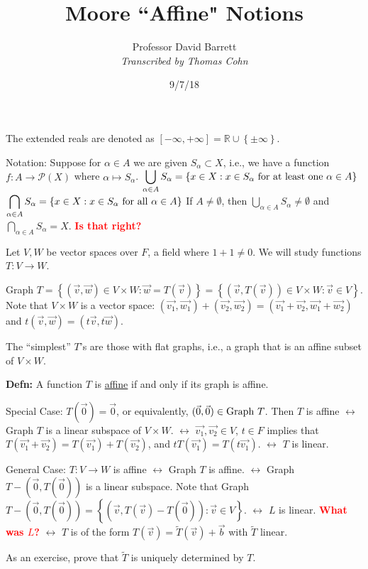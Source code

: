 \documentclass[10pt,letterpaper]{article}
\author{Professor David Barrett\\ \small\textit{Transcribed by Thomas Cohn}}
\title{Moore ``Affine" Notions}
\date{9/7/18} %
\newcommand{\n}{\hfill\break}
\newcommand{\defn}[1]{\par\noindent\settowidth{\hangindent}{\textbf{Defn: }}\textbf{Defn: }#1\n}
\newcommand{\ptxt}[1]{\textrm{\textnormal{#1}}}
\newcommand{\set}[1]{\left\{#1\right\}}
\newcommand{\ps}[1]{\mathcal{P}(#1)}
\newcommand{\reals}{\mathbb{R}}
\newcommand{\R}{\reals}
\newcommand{\flag}[1]{\textbf{\textcolor{red}{#1}}}
\begin{document}
\maketitle
\setlength\RaggedRightParindent{\parindent}
\RaggedRight

\par\noindent The extended reals are denoted as $[-\infty,+\infty]=\R\cup\set{\pm\infty}$.\n

\par\noindent Notation: Suppose for $\alpha\in{}A$ we are given $S_{\alpha}\subset{}X$, i.e., we have a function $f:A\to\ps{X}$ where $\alpha\mapsto{}S_{\alpha}$.\n
$\displaystyle\bigcup_{\alpha\in{}A}S_{\alpha}=\set{x\in{}X:x\in{}S_{\alpha}\ptxt{ for at least one }\alpha\in{}A}$\n
$\displaystyle\bigcap_{\alpha\in{}A}S_{\alpha}=\set{x\in{}X:x\in{}S_{\alpha}\ptxt{ for all }\alpha\in{}A}$\n
If $A\ne\emptyset$, then $\displaystyle\bigcup_{\alpha\in{}A}S_{\alpha}\ne\emptyset$ and $\displaystyle\bigcap_{\alpha\in{}A}S_{\alpha}=X$. \flag{Is that right?}\n\n

\par\noindent Let $V,W$ be vector spaces over $F$, a field where $1+1\ne{}0$. We will study functions $T:V\to{}W$.\n

\par\noindent Graph $T=\set{(\vec{v},\vec{w})\in{}V\times{}W:\vec{w}=T(\vec{v})}=\set{(\vec{v},T(\vec{v}))\in{}V\times{}W:\vec{v}\in{}V}$. Note that $V\times{}W$ is a vector space: $(\vec{v_{1}},\vec{w_{1}})+(\vec{v_{2}},\vec{w_{2}})=(\vec{v_{1}}+\vec{v_{2}},\vec{w_{1}}+\vec{w_{2}})$ and $t(\vec{v},\vec{w})=(t\vec{v},t\vec{w})$.\n

\par\noindent The ``simplest'' $T$'s are those with flat graphs, i.e., a graph that is an affine subset of $V\times{}W$.\n

\defn{A function $T$ is \underline{affine} if and only if its graph is affine.}

\par\noindent Special Case: $T(\vec{0})=\vec{0}$, or equivalently, $(\vec{0},\vec{0})\in\ptxt{Graph }T$.\n
Then $T$ is affine $\leftrightarrow$ Graph $T$ is a linear subspace of $V\times{}W$.\n
\phantom{Then $T$ is affine }$\leftrightarrow$ $\vec{v_{1}},\vec{v_{2}}\in{}V$, $t\in{}F$ implies that $T(\vec{v_{1}}+\vec{v_{2}})=T(\vec{v_{1}})+T(\vec{v_{2}})$, and $tT(\vec{v_{1}})=T(t\vec{v_{1}})$.\n
\phantom{Then $T$ is affine }$\leftrightarrow$ $T$ is linear.\n

\par\noindent General Case: $T:V\to{}W$ is affine $\leftrightarrow$ Graph $T$ is affine.\n
{}$\leftrightarrow$ Graph $T-(\vec{0},T(\vec{0}))$ is a linear subspace.\n
{}Note that Graph $T-(\vec{0},T(\vec{0}))=\set{(\vec{v},T(\vec{v})-T(\vec{0})):\vec{v}\in{}V}$.\n
{}$\leftrightarrow$ $L$ is linear. \flag{What was $L$?}\n
{}$\leftrightarrow$ $T$ is of the form $T(\vec{v})=\widetilde{T}(\vec{v})+\vec{b}$ with $\widetilde{T}$ linear.\n

\par\noindent As an exercise, prove that $\widetilde{T}$ is uniquely determined by $T$.
\end{document}
